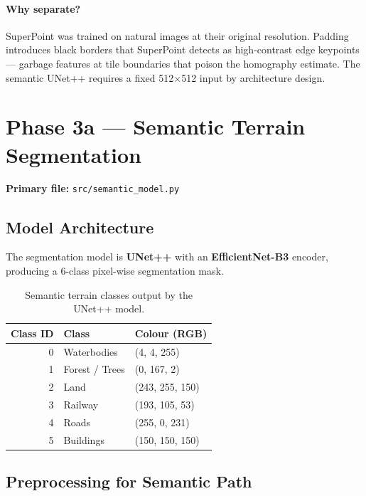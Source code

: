 \documentclass[12pt,a4paper]{article}
\begin{document}
\paragraph{Why separate?}
SuperPoint was trained on natural images at their original resolution.
Padding introduces black borders that SuperPoint detects as high-contrast
edge keypoints --- garbage features at tile boundaries that poison the
homography estimate. The semantic UNet++ requires a fixed 512$\times$512
input by architecture design.

\section{Phase 3a --- Semantic Terrain Segmentation}

\noindent\textbf{Primary file:} \texttt{src/semantic\_model.py}

\subsection{Model Architecture}

The segmentation model is \textbf{UNet++} with an \textbf{EfficientNet-B3}
encoder, producing a 6-class pixel-wise segmentation mask.

\begin{table}[H]
\centering
\begin{tabular}{@{}rll@{}}
\toprule
\textbf{Class ID} & \textbf{Class} & \textbf{Colour (RGB)} \\
\midrule
0 & Waterbodies & (4, 4, 255) \\
1 & Forest / Trees & (0, 167, 2) \\
2 & Land & (243, 255, 150) \\
3 & Railway & (193, 105, 53) \\
4 & Roads & (255, 0, 231) \\
5 & Buildings & (150, 150, 150) \\
\bottomrule
\end{tabular}
\caption{Semantic terrain classes output by the UNet++ model.}
\end{table}

\subsection{Preprocessing for Semantic Path}
\end{document}
